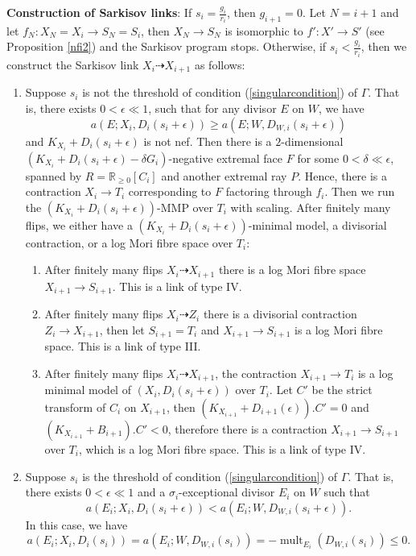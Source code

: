 \documentclass[11pt]{amsart}
\begin{document}
\textbf{Construction of Sarkisov links}\label{Construction}: If $s_{i}=\frac{g_{i}}{r_{i}}$, then $g_{i+1}=0$. Let $N=i+1$  and let $f_{N}:X_{N}=X_{i} \to S_{N}=S_{i}$, then $X_{N}\to S_{N}$ is isomorphic to $f':X'\to S'$ (see Proposition \ref{nfi2}) and  the Sarkisov program stops. Otherwise, if  $s_{i}<\frac{g_{i}}{r_{i}}$, then we construct the Sarkisov link $X_{i}\dashrightarrow X_{i+1}$ as follows:
\begin{enumerate}
  \item\label{2a} Suppose $s_{i}$ is not the threshold of  condition (\ref{singularcondition}) of $\Gamma$. That is, there exists $0<\epsilon\ll 1$, such that for any divisor $E$ on $W$, we have
  \[
    a(E;X_{i},D_{i}(s_{i}+\epsilon))\geqslant a(E;W,D_{W,i}(s_{i}+\epsilon))
  \]
  and $K_{X_{i}}+D_{i}(s_{i}+\epsilon)$ is not nef. Then there is a $2$-dimensional $(K_{X_{i}}+D_{i}(s_{i}+\epsilon)-\delta G_{i})$-negative extremal face $F$ for some $0< \delta \ll \epsilon $, spanned by $R=\mathbb{R}_{\geqslant 0}[C_{i}]$ and another extremal ray $P$. Hence, there is a contraction $X_{i}\to T_{i}$ corresponding to $F$ factoring through $f_{i}$. Then we run the $(K_{X_{i}}+D_{i}(s_{i}+\epsilon))$-MMP over $T_{i}$ with scaling. After finitely many flips, we either have a $(K_{X_{i}}+D_{i}(s_{i}+\epsilon))$-minimal model, a divisorial contraction, or a log Mori fibre space over $T_{i}$:
  \begin{enumerate}
    \item\label{2a1}After finitely many flips $X_{i}\dashrightarrow X_{i+1}$ there is a log Mori fibre space $X_{i+1}\to S_{i+1}$. This is a link of type IV.
    \item\label{2a2} After finitely many flips $X_{i}\dashrightarrow Z_{i}$ there is a divisorial contraction $Z_{i}\to X_{i+1}$, then let $S_{i+1}=T_{i}$ and $X_{i+1}\to S_{i+1}$ is a log Mori fibre space. This is a link of type III.
    \item \label{2a3}After finitely many flips $X_{i}\dashrightarrow X_{i+1}$,  the contraction $X_{i+1}\to T_{i}$ is a log minimal model of $\left(X_{i},D_{i}\left(s_{i}+\epsilon\right)\right)$ over $T_{i}$. Let  $C'$ be the strict transform of  $C_{i}$ on $X_{i+1}$, then $(K_{X_{i+1}}+D_{i+1}(\epsilon)).C'=0$ and $(K_{X_{i+1}}+B_{i+1}).C'<0$, therefore there is a contraction  $X_{i+1} \to S_{i+1}$ over $T_i$, which is a log Mori fibre space. This is a link of type IV.
  \end{enumerate}
  \item\label{2b} Suppose $s_{i}$ is the threshold of condition (\ref{singularcondition}) of $\Gamma$. That is, there exists  $0<\epsilon \ll 1$ and a $\sigma_{i}$-exceptional divisor $E_{i}$ on $W$ such that
  \[
    a(E_{i};X_{i},D_{i}(s_{i}+\epsilon))< a(E_{i};W,D_{W,i}(s_{i}+\epsilon))
    .\]
  In this case, we have
  \[
    a(E_{i};X_{i},D_{i}(s_{i}))= a(E_{i};W,D_{W,i}(s_{i}))=-\operatorname{mult}_{E_{i}}(D_{W,i}(s_{i}))\leqslant 0
    .\]


\end{enumerate}
\end{document}
